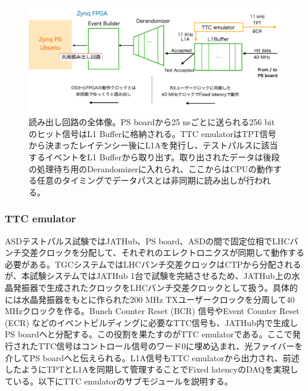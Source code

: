 \begin{figure} 
\centering
\includegraphics[width=16cm]{fig/QAQC/JATHubdaq.png}
\caption[読み出し回路の全体像]{読み出し回路の全体像。PS boardから25 nsごとに送られる256 bitのヒット信号はL1 Bufferに格納される。TTC emulatorはTPT信号から決まったレイテンシー後にL1Aを発行し、テストパルスに該当するイベントをL1 Bufferから取り出す。取り出されたデータは後段の処理待ち用のDerandomizerに入れられ、ここからはCPUの動作する任意のタイミングでデータパスとは非同期に読み出しが行われる。}
\label{JATHubdaq}
\end{figure}

\subsubsection{TTC emulator} \par
ASDテストパルス試験ではJATHub、PS board、ASDの間で固定位相でLHCバンチ交差クロックを分配して、それぞれのエレクトロニクスが同期して動作する必要がある。TGCシステムではLHCバンチ交差クロックはCTPから分配されるが、本試験システムではJATHub 1台で試験を完結させるため、JATHub上の水晶発振器で生成されたクロックをLHCバンチ交差クロックとして扱う。具体的には水晶発振器をもとに作られた200 MHz TXユーザークロックを分周して40 MHzクロックを作る。Bunch Counter Reset (BCR) 信号やEvent Counter Reset (ECR) などのイベントビルディングに必要なTTC信号も、JATHub内で生成しPS boardへと分配する。この役割を果たすのがTTC emulatorである。ここで発行されたTTC信号はコントロール信号のワード0に埋め込まれ、光ファイバーを介してPS boardへと伝えられる。L1A信号もTTC emulatorから出力され、前述したようにTPTとL1Aを同期して管理することでFixed latencyのDAQを実現している。以下にTTC emulatorのサブモジュールを説明する。
\baselineskip


